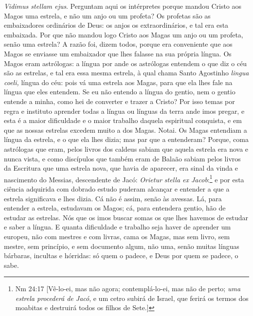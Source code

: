 \emph{Vidimus stellam ejus}. Perguntam aqui os intérpretes
porque mandou Cristo aos Magos uma estrela, e não um anjo ou um profeta?
Os profetas são as embaixadores ordinários de Deus: os anjos os
extraordinários, e tal era esta embaixada. Por que não mandou logo
Cristo aos Magas um anjo ou um profeta, senão uma estrela? A razão foi,
dizem todos, porque era conveniente que aos Magos se enviasse um
embaixador que lhes falasse na sua própria língua. Os Magos eram
astrólogas: a língua por ande os astrólogas entendem o que diz o céu são
as estrelas, e tal era essa mesma estrela, à qual chama Santo Agostinho
\emph{lingua coeli,} língua do céu: pois vá uma estrela aos Magas, para
que ela lhes fale na língua que eles entendem. Se eu não entendo a
língua do gentio, nem o gentio entende a minha, como hei de converter e
trazer a Cristo? Por isso temas por regra e instituto aprender todas a
língua ou línguas da terra ande imos pregar, e esta é a maior
dificuldade e o maior trabalho daquela espiritual conquista, e em que as
nossas estrelas excedem muito a dos Magas. Notai. Os Magas entendiam a
língua da estrela, e o que ela lhes dizia; mas par que a entenderam?
Porque, coma astrólogas que eram, pelos livros dos caldeus sabiam que
aquela estrela era nova e nunca vista, e como discípulos que também eram
de Balaão sabiam pelos livros da Escritura que uma estrela nova, que
havia de aparecer, era sinal da vinda e nascimento do Messias,
descendente de Jacó: \emph{Orietur stella ex Jacob}:\footnote{Nm 24:17 [Vê-lo-ei, mas não agora; contemplá-lo-ei, mas não de perto; \emph{uma estrela procederá de
Jacó}, e um cetro subirá de Israel, que ferirá os termos dos moabitas e destruirá todos os filhos de Sete.]} e
por esta ciência adquirida com dobrado estudo puderam alcançar e
entender a que a estrela significava e lhes dizia. Cá não é assim, senão
às avessas. Lá, para entender a estrela, estudavam os Magos; cá, para
entendera gentio, hão de estudar as estrelas. Nós que os imos buscar
somas os que lhes havemos de estudar e saber a língua. E quanta
dificuldade e trabalho seja haver de aprender um europeu, não com
mestres e com livras, cama os Magas, mas sem livro, sem mestre, sem
princípio, e sem documento algum, não uma, senão muitas línguas
bárbaras, incultas e hórridas: só quem o padece, e Deus por quem se
padece, o sabe.

